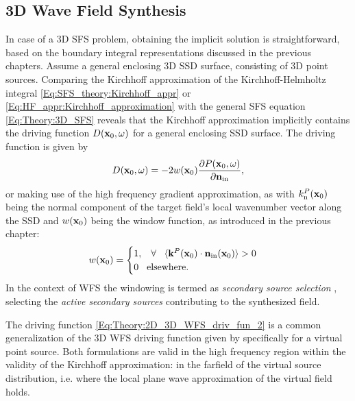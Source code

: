 \subsection{3D Wave Field Synthesis}

In case of a 3D SFS problem, obtaining the implicit solution is straightforward, based on the boundary integral representations discussed in the previous chapters.
Assume a general enclosing 3D SSD surface, consisting of 3D point sources.
Comparing the Kirchhoff approximation of the Kirchhoff-Helmholtz integral \eqref{Eq:SFS_theory:Kirchhoff_appr} or \eqref{Eq:HF_appr:Kirchhoff_approximation} with the general SFS equation \eqref{Eq:Theory:3D_SFS} reveals that the Kirchhoff approximation implicitly contains the driving function $D(\mathbf{x}_0,\omega)$ for a general enclosing SSD surface.
The driving function is given by
\begin{equation}
D(\mathbf{x}_0,\omega) = - 2w(\mathbf{x}_0)\frac{\partial P(\mathbf{x}_0,\omega)}{\partial \mathbf{n}_{\mathrm{in}}}, 
\label{Eq:Theory:2D_3D_WFS_driv_fun}
\end{equation}
or making use of the high frequency gradient approximation, as
with $k_{\mathrm{n}}^P(\mathbf{x}_0)$ being the normal component of the target field's local wavenumber vector along the SSD and $w(\mathbf{x}_0)$ being the window function, as introduced in the previous chapter:
\begin{equation}
\label{Eq:Theory:SSD_selection}
w(\mathbf{x}_0) = \begin{cases}
                        1, \hspace{3mm} \forall \hspace{3mm} \langle \mathbf{k}^P(\mathbf{x}_0) \cdot \mathbf{n}_{\text{in}}(\mathbf{x}_0) \rangle > 0 \\
                        0  \hspace{3mm} \text{elsewhere}.
                    \end{cases}
\end{equation}
In the context of WFS the windowing is termed as \emph{secondary source selection} \cite{nicol19993d, Spors2007:DAGA:SS_selection_criterion, Spors2007}, selecting the \emph{active secondary sources} contributing to the synthesized field.

The driving function \eqref{Eq:Theory:2D_3D_WFS_driv_fun_2} is a common generalization of the 3D WFS driving function given by \cite[(20)]{Zotter2013:uniqueness} specifically for a virtual point source.
Both formulations are valid in the high frequency region within the validity of the Kirchhoff approximation: in the farfield of the virtual source distribution, i.e. where the local plane wave approximation of the virtual field holds.

